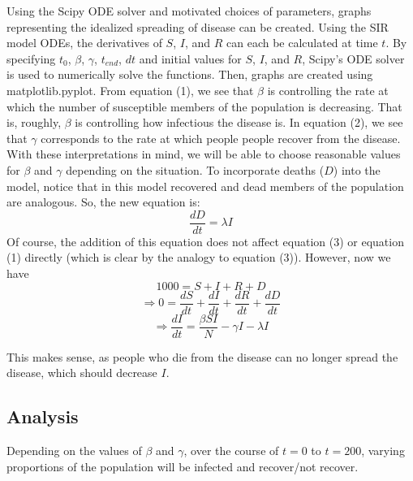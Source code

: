 \documentclass{article}
\begin{document}
Using the Scipy ODE solver and motivated choices of parameters, graphs
representing the idealized spreading of disease can be created. Using the SIR model
ODEs, the derivatives of $S$, $I$, and $R$ can each be calculated at time $t$.
By specifying $t_0$, $\beta$, $\gamma$, $t_{end}$, $dt$ and initial values for
$S$, $I$, and $R$, Scipy's ODE solver is used to numerically solve the
functions. Then, graphs are created using matplotlib.pyplot. From equation
(1), we see that $\beta$ is controlling the rate at which the number of
susceptible members of the population is decreasing. That is, roughly,
$\beta$ is controlling how infectious the disease is. In equation (2),
we see that $\gamma$ corresponds to the rate at which people people recover
from the disease. With these interpretations in mind, we will be able to choose
reasonable values for $\beta$ and $\gamma$ depending on the situation.
To incorporate deaths ($D$) into the model, notice that in this model recovered
and dead members of the population are analogous. So, the new equation is:
\[ \frac{dD}{dt} = \lambda I\]
Of course, the addition of this equation does not affect equation (3) or
equation (1) directly (which is clear by the analogy to equation (3)). However,
now we have \[ 1000 = S + I + R + D\]
\[\Rightarrow 0 = \frac{dS}{dt} +\frac{dI}{dt} + \frac{dR}{dt} + \frac{dD}{dt}\]
\[\Rightarrow \frac{dI}{dt} = \frac{\beta S I}{N}  - \gamma I - \lambda I\]

This makes sense, as people who die from the disease can no longer spread the
disease, which should decrease $I$.

\subsection*{Analysis}

Depending on the values of $\beta$ and $\gamma$, over the course of $t = 0$ to
$t = 200$, varying proportions of the population will be infected and
recover/not recover.
\end{document}

